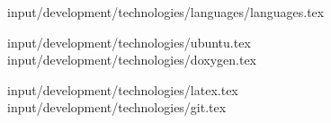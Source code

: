  {input/development/technologies/languages/languages.tex}

 {input/development/technologies/ubuntu.tex}
 {input/development/technologies/doxygen.tex}

 {input/development/technologies/latex.tex}
 {input/development/technologies/git.tex}




